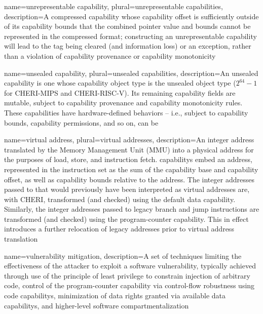 {
  name=unrepresentable capability,
  plural=unrepresentable capabilities,
  description={A \gls{compressed capability} whose \gls{capability offset} is
    sufficiently outside of its \gls{capability bounds} that the combined
    \gls{pointer} value and bounds cannot be represented in the compressed format;
    constructing an unrepresentable capability will lead to the tag being
    cleared (and information loss) or an exception, rather than a violation
    of \gls{capability provenance} or \gls{capability monotonicity}}
}

{
  name=unsealed capability,
  plural=unsealed capabilities,
  description={An unsealed \gls{capability} is one whose \gls{capability object type}
    is the unsealed object type ($2^{64}-1$ for \gls{CHERI-MIPS} and \gls{CHERI-RISC-V}).
    Its remaining capability fields are mutable, subject to \gls{capability
    provenance} and \gls{capability monotonicity} rules.
    These capabilities have hardware-defined behaviors -- i.e., subject to
    \gls{capability bounds}, \gls{capability permissions}, and so on,
    can be }
}

{
  name=virtual address,
  plural=virtual addresses,
  description={An integer \gls{address} translated by the Memory Management
    Unit (MMU) into a \gls{physical address} for the purposes of load, store,
    and instruction fetch.
    \Glspl{capability} embed an address, represented in the instruction
    set as the sum of the \gls{capability base} and \gls{capability offset},
    as well as \gls{capability bounds} relative to the address.
    The integer addresses passed to  that would previously have been interpreted as
    virtual addresses are, with CHERI, transformed (and checked) using the
    \gls{default data capability}.
    Similarly, the integer addresses passed to legacy branch and jump
    instructions are transformed (and checked) using the \gls{program-counter
    capability}.
    This in effect introduces a further relocation of legacy addresses prior
    to virtual address translation}
}

{
  name=vulnerability mitigation,
  description={A set of techniques limiting the effectiveness of the attacker
    to exploit a software vulnerability, typically achieved through use of
    the \gls{principle of least privilege} to constrain injection of
    arbitrary code, control of the \gls{program-counter capability} via
    \gls{control-flow robustness} using \glspl{code capability}, minimization of
    data rights granted via available \glspl{data capability}, and higher-level
    \gls{software compartmentalization}}
}
